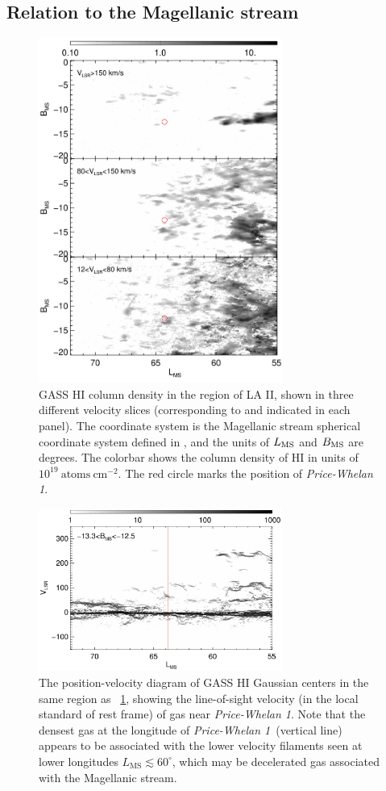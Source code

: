 \documentclass[twocolumn]{aastex62}
\newcommand{\hi}{H{\footnotesize I} }
\newcommand{\clustername}{\textsl{Price-Whelan 1}}
\begin{document}
\subsection{Relation to the Magellanic stream}
\label{sec:higas}

\begin{figure}[t]
\centering
\includegraphics[width=8cm]{figures/gass_maps_v3.pdf}
\caption{GASS \hi column density in the region of LA II, shown in three different velocity slices (corresponding to and indicated in each panel).
The coordinate system is the Magellanic stream spherical coordinate system defined in \cite{Nidever:2008}, and the units of $L_{\rm MS}$ and $B_{\rm MS}$ are degrees.
The colorbar shows the column density of \hi in units of $10^19~\textrm{atoms}~\textrm{cm}^{-2}$.
The red circle marks the position of \clustername.}
\label{fig:gass_maps}
\end{figure}

\begin{figure}[t]
\centering
\includegraphics[width=8cm]{figures/gass_vlsrmlon.pdf}
\caption{The position-velocity diagram of GASS \hi Gaussian centers in the same region as \figurename~\ref{fig:gass_maps}, showing the line-of-sight velocity (in the local standard of rest frame) of gas near \clustername.
Note that the densest gas at the longitude of \clustername\ (vertical line) appears to be associated with the lower velocity filaments seen at lower longitudes $L_{\textrm{MS}} \lesssim 60^\circ$, which may be decelerated gas associated with the Magellanic stream.
}
\label{fig:gasspv}
\end{figure}
\end{document}
